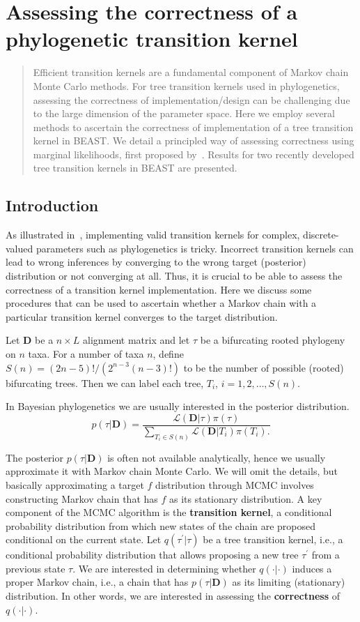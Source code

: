 \chapter{Assessing the correctness of a phylogenetic transition kernel}
\begin{abstract}
Efficient transition kernels are a fundamental component of Markov chain Monte Carlo methods.
For tree transition kernels used in phylogenetics, assessing the correctness of implementation/design can be challenging due to the large dimension of the parameter space.
Here we employ several methods to ascertain the correctness of implementation of a tree transition kernel in BEAST.
We detail a principled way of assessing correctness using marginal likelihoods, first proposed by~\cite{Hoehna2008}.
Results for two recently developed tree transition kernels in BEAST are presented.
\end{abstract}

\section*{Introduction}

As illustrated in~\cite{Holder2005}, implementing valid transition kernels for complex, discrete-valued parameters such as phylogenetics is tricky.
Incorrect transition kernels can lead to wrong inferences by converging to the wrong target (posterior) distribution or not converging at all.
Thus, it is crucial to be able to assess the correctness of a transition kernel implementation. 
Here we discuss some procedures that can be used to ascertain whether a Markov chain with a particular transition kernel converges to the target distribution. 

Let $\boldsymbol D$ be a $n \times L$ alignment matrix and let $\tau$ be a bifurcating rooted phylogeny on $n$ taxa.
For a number of taxa $n$, define $S(n) = (2n-5)!/(2^{n-3}(n-3)!)$ to be the number of possible (rooted) bifurcating trees.
Then we can label each tree, $T_i$, $i = 1, 2, \ldots, S(n)$. 

In Bayesian phylogenetics we are usually interested in the posterior distribution.
\[ p(\tau | \boldsymbol D) = \frac{\mathcal{L}(\boldsymbol D | \tau)\pi(\tau)}{\sum_{T_i \in S(n)} \mathcal{L}(\boldsymbol D | T_i) \pi(T_i). }\]

The posterior $p(\tau | \boldsymbol D)$ is often not available analytically, hence we usually approximate it with Markov chain Monte Carlo.
We will omit the details, but basically approximating a target $f$ distribution through MCMC involves constructing Markov chain that has $f$ as its stationary distribution.
A key component of the MCMC algorithm is the \textbf{transition kernel}, a conditional probability distribution from which new states of the chain are proposed conditional on the current state.
Let $q(\tau^\prime | \tau)$ be  a tree transition kernel, i.e., a conditional probability distribution that allows proposing a new tree $\tau^\prime$ from a previous state $\tau$.
We are interested in determining whether $q(\cdot|\cdot)$ induces a proper Markov chain, i.e., a chain that has $p(\tau | \boldsymbol D)$ as its limiting (stationary) distribution.
In other words, we are interested in assessing the \textbf{correctness} of $q(\cdot|\cdot)$.

